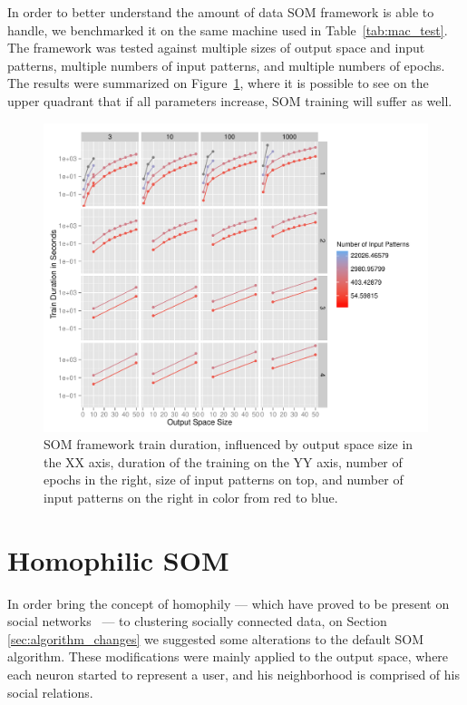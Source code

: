 In order to better understand the amount of data \ac{SOM} framework is able to handle, we benchmarked it on the same machine used in Table~\ref{tab:mac_test}. The framework was tested against multiple sizes of output space and input patterns, multiple numbers of input patterns, and multiple numbers of epochs. 
The results were summarized on Figure~\ref{fig:benchmarkingsom}, where it is possible to see on the upper quadrant that if all parameters increase, \ac{SOM} training will suffer as well.

\begin{figure}[h!]
  \centering
  \includegraphics[width=0.8\linewidth]{./plots/som/benchmarking.pdf}
  \caption{SOM framework train duration, influenced by output space size in the XX axis, duration of the training on the YY axis, number of epochs in the right, size of input patterns on top, and number of input patterns on the right in color from red to blue.}
  \label{fig:benchmarkingsom}
\end{figure}


\section{Homophilic SOM}
\label{sec:homophilic_som}

In order bring the concept of homophily --- which have proved to be present on social networks~\cite[]{Wehrens2007}  --- to clustering socially connected data, on Section \ref{sec:algorithm_changes} we suggested some alterations to the default \ac{SOM} algorithm. These modifications were mainly applied to the output space, where each neuron started to represent a user, and his neighborhood is comprised of his social relations.

